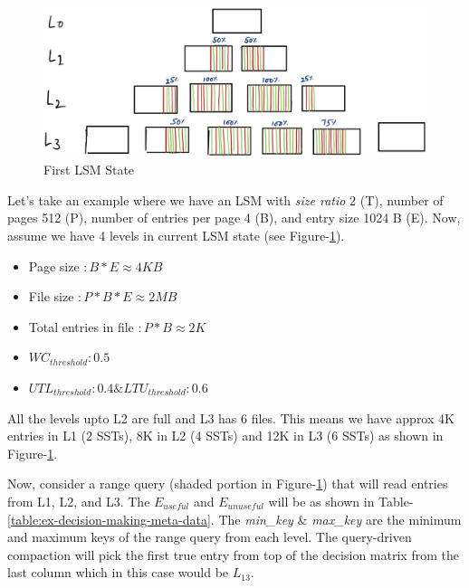\begin{figure}
    \includegraphics[scale=0.08]{Figures/first-state-lsm.jpg}
    \caption{First LSM State}\label{fig:first-state-lsm}
\end{figure}

Let's take an example where we have an LSM with \textit{size ratio} 2 (T), number of pages 512 (P), 
number of entries per page 4 (B), and entry size 1024 B (E). Now, assume we have 4 levels in current LSM state 
(see Figure-\ref{fig:first-state-lsm}).

\begin{itemize}
    \item Page size $\colon B * E \approx 4 KB$
    \item File size $\colon P * B * E \approx 2 MB$
    \item Total entries in file $\colon P * B \approx 2 K$
    \item $WC_{threshold} \colon 0.5$
    \item $UTL_{threshold} \colon 0.4 \& LTU_{threshold} \colon 0.6$ 
\end{itemize}

All the levels upto L2 are full and L3 has 6 files. This means we have approx 4K entries in L1 (2 SSTs), 8K in 
L2 (4 SSTs) and 12K in L3 (6 SSTs) as shown in Figure-\ref{fig:first-state-lsm}.

Now, consider a range query (shaded portion in Figure-\ref{fig:first-state-lsm}) that will read entries from L1, L2, and L3.
The $E_{useful}$ and $E_{unuseful}$ will be as shown in Table-\ref{table:ex-decision-making-meta-data}. 
The \textit{min\_key} \& \textit{max\_key} are the minimum and maximum keys of the range query from each level. The 
query-driven compaction will pick the first true entry from top of the decision matrix from the last column which in this 
case would be $L_{13}$.

